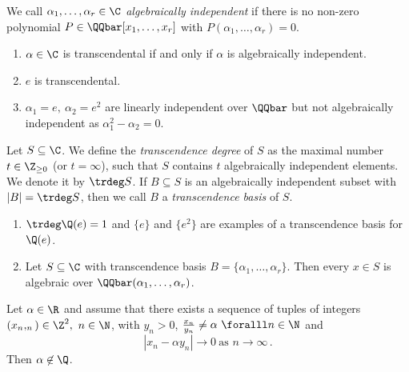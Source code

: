 \begin{defn*}
	We call \( \alpha_1, \dotsc, \alpha_r \in \C \) \emph{algebraically independent} if there is no non-zero polynomial \( P \in \QQbar[x_1, \dotsc, x_r] \) with \( P(\alpha_1, \dotsc, \alpha_r) = 0 \).
\end{defn*}

\begin{exmp*}
	\begin{enumerate}
		\item \( \alpha \in \C \) is transcendental if and only if \( \alpha \) is algebraically independent.
		\item \( e \) is transcendental.
		\item \( \alpha_1 = e,\ \alpha_2 = e^2 \) are linearly independent over \( \QQbar \) but not algebraically independent as \( \alpha_1^2 - \alpha_2 = 0 \).
	\end{enumerate}
\end{exmp*}

\begin{defn*}
	Let \( S \subseteq \C \).
	We define the \emph{transcendence degree} of \( S \) as the maximal number \( t \in \Z_{\geq 0} \) (or \( t = \infty \)), such that \( S \) contains \( t \) algebraically independent elements.
	We denote it by \( \trdeg S \).
	If \( B \subseteq S \) is an algebraically independent subset with \( |B| = \trdeg S \), then we call \( B \) a \emph{transcendence basis} of \( S \).
\end{defn*}

\begin{exmp*}
	\begin{enumerate}
		\item \( \trdeg \Q(e) = 1 \) and \( \{e\} \) and \( \{e^2\} \) are examples of a transcendence basis for \( \Q(e) \).
		\item Let \( S \subseteq \C \) with transcendence basis \( B = \{\alpha_1, \dotsc, \alpha_r\} \).
			Then every \( x \in S \) is algebraic over \( \QQbar(\alpha_1, \dots, \alpha_r) \).
	\end{enumerate}
\end{exmp*}

\begin{lem}
	Let \( \alpha \in \R \) and assume that there exists a sequence of tuples of integers \( (x_n, _n) \in \Z^2,\ n \in \N \), with \( y_n>0 \), \( \frac{x_n}{y_n} \neq \alpha \ \foralll n \in \N \) and
	\[ |x_n - \alpha y_n| \to 0\ \text{as } n \to \infty \,. \]
	Then \( \alpha \not\in \Q \).
\end{lem}

